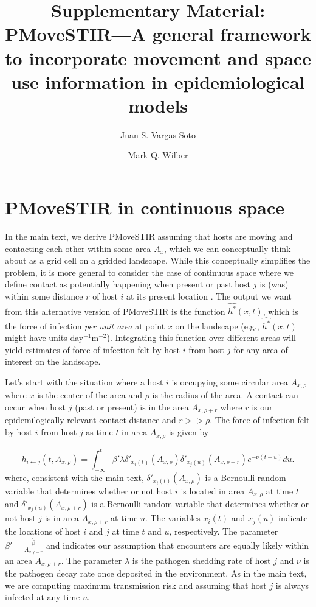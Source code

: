 \documentclass[letterpaper]{article}
\title{Supplementary Material: PMoveSTIR---A general framework to incorporate movement and space use information in epidemiological models}
\author{Juan S. Vargas Soto \and Mark Q. Wilber}
\affil{School of Natural Resources, University of Tennessee, Knoxville, TN}
\date{}
\begin{document}
\doublespacing
\linenumbers

\section{PMoveSTIR in continuous space}

In the main text, we derive PMoveSTIR assuming that hosts are moving and contacting each other within some area $A_x$, which we can conceptually think about as a grid cell on a gridded landscape.  While this conceptually simplifies the problem, it is more general to consider the case of continuous space where we define contact as potentially happening when present or past host $j$ is (was) within some distance $r$ of host $i$ at its present location \citep{Wilber2022}.  The output we want from this alternative version of PMoveSTIR is the function $\hat{h^*}(x, t)$, which is the force of infection \emph{per unit area} at point $x$ on the landscape (e.g., $\hat{h^*}(x, t)$ might have units day$^{-1}\text{m}^{-2}$).  Integrating this function over different areas will yield estimates of force of infection felt by host $i$ from host $j$ for any area of interest on the landscape.

Let's start with the situation where a host $i$ is occupying some circular area $A_{x, \rho}$ where $x$ is the center of the area and $\rho$ is the radius of the area.  A contact can occur when host $j$ (past or present) is in the area $A_{x, \rho + r}$ where $r$ is our epidemilogically relevant contact distance and $r >> \rho$.  The force of infection felt by host $i$ from host $j$ as time $t$ in area $A_{x, \rho}$ is given by

\begin{equation}
    h_{i \leftarrow j}(t, A_{x, \rho}) = \int_{-\infty}^{t} \beta' \lambda \delta'_{x_i(t)}(A_{x, \rho}) \delta'_{x_j(u)}(A_{x, \rho + r}) e^{-\nu(t - u)} du.
    \label{eq:prob_foi}
\end{equation} 
where, consistent with the main text, $\delta'_{x_i(t)}(A_{x, \rho})$ is a Bernoulli random variable that determines whether or not host $i$ is located in area $A_{x, \rho}$ at time $t$ and $\delta'_{x_j(u)}(A_{x, \rho + r})$ is a Bernoulli random variable that determines whether or not host $j$ is in area $A_{x, \rho + r}$ at time $u$.  The variables $x_i(t)$ and $x_j(u)$ indicate the locations of host $i$ and $j$ at time $t$ and $u$, respectively.  The parameter $\beta' = \frac{\tilde{\beta}}{A_{x, \rho + r}}$ and indicates our assumption that encounters are equally likely within an area $A_{x, \rho + r}$. The parameter $\lambda$ is the pathogen shedding rate of host $j$ and $\nu$ is the pathogen decay rate once deposited in the environment.  As in the main text, we are computing maximum transmission risk and assuming that host $j$ is always infected at any time $u$.
\end{document}
